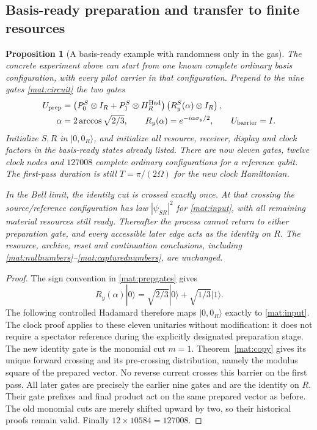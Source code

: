 \documentclass[11pt]{article}
\newtheorem{proposition}[theorem]{Proposition}
\theoremstyle{definition}\newtheorem{definition}[theorem]{Definition}
\theoremstyle{remark}\newtheorem{remark}[theorem]{Remark}
\begin{document}
\subsection{Basis-ready preparation and transfer to finite resources}

\begin{proposition}[A basis-ready example with randomness only in the gas]
\label{mat:basisprep}
The concrete experiment above can start from one known complete ordinary
basis configuration, with every pilot carrier in that configuration.
Prepend to the nine gates \eqref{mat:circuit} the two gates
\begin{align}\label{mat:prepgates}
 U_{\rm prep}
 &=\left(P_0^S\otimes I_R+P_1^S\otimes H_R^{\rm Had}\right)
       \left(R_y^S(\alpha)\otimes I_R\right),\\
 \alpha&=2\arccos\sqrt{2/3},\qquad
 R_y(\alpha)=e^{-i\alpha\sigma_y/2},\qquad
 U_{\rm barrier}=I.\nonumber
\end{align}
Initialize $S,R$ in $|0,0_R\rangle$, and initialize all resource,
receiver, display and clock factors in the basis-ready states already
listed.  There are now eleven gates, twelve clock nodes and $127008$
complete ordinary configurations for a reference qubit.  The first-pass
duration is still $T=\pi/(2\Omega)$ for the new clock Hamiltonian.

In the Bell limit, the identity cut is crossed exactly once.  At that
crossing the source/reference configuration has law $|\psi_{SR}|^2$
for \eqref{mat:input}, with all remaining material resources still ready.
Thereafter the process cannot return to either preparation gate, and
every accessible later edge acts as the identity on $R$.  The resource,
archive, reset and continuation conclusions, including
\eqref{mat:nullnumbers}--\eqref{mat:capturednumbers}, are unchanged.
\end{proposition}
\begin{proof}
The sign convention in \eqref{mat:prepgates} gives
\[
 R_y(\alpha)|0\rangle=\sqrt{2/3}|0\rangle+
                                \sqrt{1/3}|1\rangle.
\]
The following controlled Hadamard therefore maps $|0,0_R\rangle$
exactly to \eqref{mat:input}.  The clock proof applies to these eleven
unitaries without modification: it does not require a spectator
reference during the explicitly designated preparation stage.
The new identity gate is the monomial cut $m=1$.
Theorem~\ref{mat:copy} gives its unique forward crossing and its
pre-crossing distribution, namely the modulus square of the prepared
vector.  No reverse current crosses this barrier on the first pass.
All later gates are precisely the earlier nine gates and are the
identity on $R$.  Their gate prefixes and final product act on the
same prepared vector as before.  The old monomial cuts are merely
shifted upward by two, so their historical proofs remain valid.
Finally $12\times10584=127008$.
\end{proof}
\end{document}
